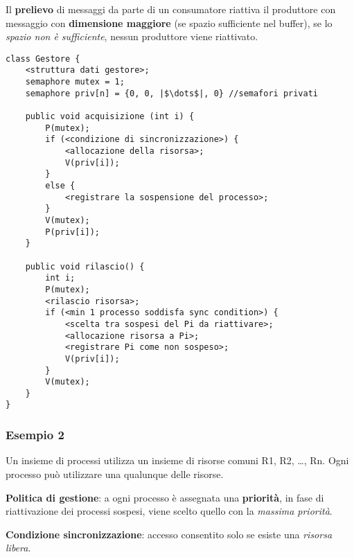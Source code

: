 Il \textbf{prelievo} di messaggi da parte di un consumatore riattiva il produttore con messaggio con \textbf{dimensione maggiore} (se spazio sufficiente nel buffer), se lo \textit{spazio non è sufficiente}, nessun produttore viene riattivato.

\begin{verbatim}
class Gestore {
    <struttura dati gestore>;
    semaphore mutex = 1;
    semaphore priv[n] = {0, 0, |$\dots$|, 0} //semafori privati

    public void acquisizione (int i) {
        P(mutex);
        if (<condizione di sincronizzazione>) {
            <allocazione della risorsa>;
            V(priv[i]);
        }
        else {
            <registrare la sospensione del processo>;
        }
        V(mutex);
        P(priv[i]);
    }

    public void rilascio() {
        int i;
        P(mutex);
        <rilascio risorsa>;
        if (<min 1 processo soddisfa sync condition>) {
            <scelta tra sospesi del Pi da riattivare>;
            <allocazione risorsa a Pi>;
            <registrare Pi come non sospeso>;
            V(priv[i]);
        }
        V(mutex);
    }
}
\end{verbatim}

\subsubsection{Esempio 2}
Un insieme di processi utilizza un insieme di risorse comuni R1, R2, \dots, Rn. Ogni processo può utilizzare una qualunque delle risorse.

\textbf{Politica di gestione}: a ogni processo è assegnata una \textbf{priorità}, in fase di riattivazione dei processi sospesi, viene scelto quello con la \textit{massima priorità}.

\textbf{Condizione sincronizzazione}: accesso consentito solo se esiste una \textit{risorsa libera}.









































































